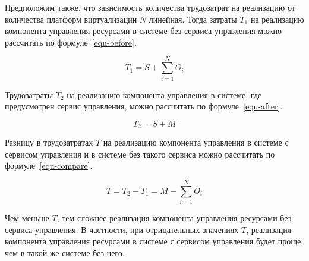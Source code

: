 Предположим также, что зависимость количества трудозатрат на реализацию от количества платформ виртуализации $N$ линейная. 
Тогда затраты $T_1$ на реализацию компонента управления ресурсами в системе без сервиса управления можно рассчитать по формуле~\ref{equ-before}.

\begin{equation}
T_1=S+\sum_{i=1}^{N} O_i
\label{equ-before}
\end{equation}

Трудозатраты $T_2$ на реализацию компонента управления в системе, где предусмотрен сервис управления, можно рассчитать по формуле~\ref{equ-after}.

\begin{equation}
T_2=S+M
\label{equ-after}
\end{equation}

Разницу в трудозатратах $T$ на реализацию компонента управления в системе с сервисом управления и в системе без такого сервиса можно рассчитать по формуле~\ref{equ-compare}.

\begin{equation}
T = T_2 - T_1 = M - \sum_{i=1}^{N} O_i
\label{equ-compare}
\end{equation}

Чем меньше $T$, тем сложнее реализация компонента управления ресурсами без сервиса управления.
В частности, при отрицательных значениях $T$, реализация компонента управления ресурсами в системе с сервисом управления будет проще, чем в такой же системе без него.
